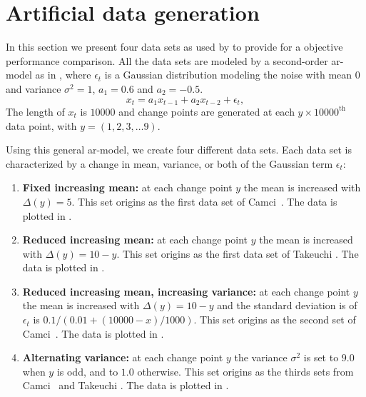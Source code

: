 \section{Artificial data generation}\label{sec:artificial_data_generation}
In this section we present four data sets as used by \cite{camci2010change,takeuchi2006unifying} to provide for a objective performance comparison.
All the data sets are modeled by a second-order \gls{ar}-model as in , where $\epsilon_t$ is a Gaussian distribution modeling the noise with mean $0$ and variance $\sigma^2 = 1$, $a_1 = 0.6$ and $a_2 = -0.5$.
\begin{equation}\label{eq:artificial_data_sets_model}
  x_t = a_1 x_{t-1} + a_2 x_{t-2} + \epsilon_t,
\end{equation}
The length of $x_t$ is $10000$ and change points are generated at each $y \times 10000^\text{th}$ data point, with $y = (1, 2, 3, \dots 9)$.

Using this general \gls{ar}-model, we create four different data sets.
Each data set is characterized by a change in mean, variance, or both of the Gaussian term $\epsilon_t$:
\begin{enumerate}
  \item \textbf{Fixed increasing mean:} at each change point $y$ the mean is increased with $\Delta(y) = 5$.
  This set origins as the first data set of Camci~\cite{camci2010change}.
  The data is plotted in .

  \item \textbf{Reduced increasing mean:} at each change point $y$ the mean is increased with $\Delta(y) = 10 - y$.
  This set origins as the first data set of Takeuchi \etal \cite{takeuchi2006unifying}.
  The data is plotted in .

  \item \textbf{Reduced increasing mean, increasing variance:} at each change point $y$ the mean is increased with $\Delta(y) = 10 - y$ and the standard deviation is of $\epsilon_t$ is $0.1 / (0.01 + (10000 - x)/1000)$.
  This set origins as the second set of Camci~\cite{camci2010change}.
  The data is plotted in .

  \item \textbf{Alternating variance:} at each change point $y$ the variance $\sigma^2$ is set to $9.0$ when $y$ is odd, and to $1.0$ otherwise.
  This set origins as the thirds sets from Camci~\cite{camci2010change} and Takeuchi \etal \cite{takeuchi2006unifying}.
  The data is plotted in .
\end{enumerate}

